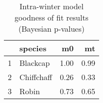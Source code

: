 \begin{table}[ht]
\centering
\begin{tabular}{rlrr}
  \hline
 & species & m0 & mt \\ 
  \hline
1 & Blackcap & 1.00 & 0.99 \\ 
  2 & Chiffchaff & 0.26 & 0.33 \\ 
  3 & Robin & 0.73 & 0.65 \\ 
   \hline
\end{tabular}
\caption{Intra-winter model goodness of fit results (Bayesian p-values)} 
\label{tab:gof_results_intra}
\end{table}
